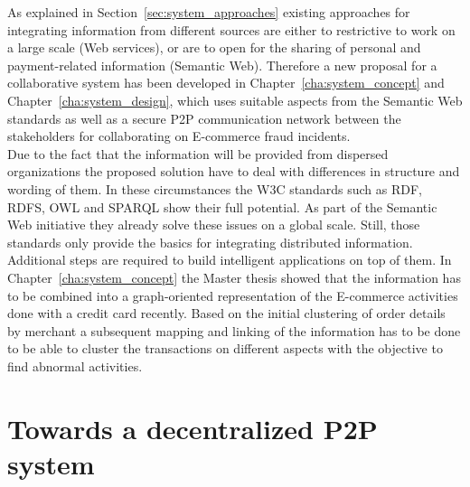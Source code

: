 As explained in Section~\ref{sec:system_approaches} existing approaches for integrating information from different sources are either to restrictive to work on a large scale (Web services), or are to open for the sharing of personal and payment-related information (Semantic Web). Therefore a new proposal for a collaborative system has been developed in Chapter~\ref{cha:system_concept} and Chapter~\ref{cha:system_design}, which uses suitable aspects from the Semantic Web standards as well as a secure \gls{P2P} communication network between the stakeholders for collaborating on \gls{E-commerce} fraud incidents. \\

Due to the fact that the information will be provided from dispersed organizations the proposed solution have to deal with differences in structure and wording of them. In these circumstances the \gls{W3C} standards such as \gls{RDF}, \gls{RDFS}, \gls{OWL} and \gls{SPARQL} show their full potential. As part of the Semantic Web initiative they already solve these issues on a global scale. Still, those standards only provide the basics for integrating distributed information. Additional steps are required to build intelligent applications on top of them. In Chapter~\ref{cha:system_concept} the Master thesis showed that the information has to be combined into a graph-oriented representation of the \gls{E-commerce} activities done with a credit card recently. Based on the initial clustering of order details by merchant a subsequent mapping and linking of the information has to be done to be able to cluster the transactions on different aspects with the objective to find abnormal activities.

\section{Towards a decentralized \gls{P2P} system}
\label{sec:p2p_decentralized_system}

